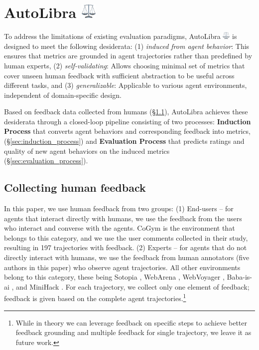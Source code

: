 \section{\texorpdfstring{AutoLibra
	  \includegraphics[height=1em]{figs/scale.png}}{AutoLibra}}

To address the limitations of existing evaluation paradigms, AutoLibra \protect
\includegraphics[height=1em]{figs/scale.png}
is designed to meet the following desiderata: (1) \emph{induced from agent
	behavior}: This ensures that metrics are grounded in agent trajectories rather than
predefined by human experts, (2) \emph{self-validating}: Allows choosing minimal
set of metrics that cover unseen human feedback with sufficient abstraction to
be useful across different tasks, and (3) \emph{generalizable}: Applicable to various
agent environments, independent of domain-specific design.

Based on feedback data collected from humans (\S\ref{sec:collecting-human-feedback}),
AutoLibra achieves these desiderata through a closed-loop pipeline consisting of
two processes: \textbf{Induction Process} that converts agent behaviors and
corresponding feedback into metrics, (\S\ref{sec:induction_process}) and \textbf{Evaluation
	Process} that predicts ratings and quality of new agent behaviors on the induced
metrics (\S\ref{sec:evaluation_process}).

\subsection{Collecting human feedback}
\label{sec:collecting-human-feedback} In this paper, we use human feedback from two
groups: (1) End-users -- for agents that interact directly with humans, we use
the feedback from the users who interact and converse with the agents. CoGym \citep{shao2024collaborative}
is the environment that belongs to this category, and we use the user comments collected
in their study, resulting in 197 trajectories with feedback. (2) Experts -- for
agents that do not directly interact with humans, we use the feedback from human
annotators (five authors in this paper) who observe agent trajectories. All
other environments belong to this category, these being Sotopia \citep{zhousotopia},
WebArena \citep{zhouwebarena}, WebVoyager \citep{he2024webvoyager}, Baba-is-ai \citep{cloos2024babaaibreakrules},
and MiniHack \citep{samvelyan2021minihackplanetsandboxopenended}. For each trajectory,
we collect only one element of feedback; feedback is given based on the complete
agent trajectories.\footnote{While in theory we can leverage feedback on
	specific steps to achieve better feedback grounding and multiple feedback for
	single trajectory, we leave it as future work.}

